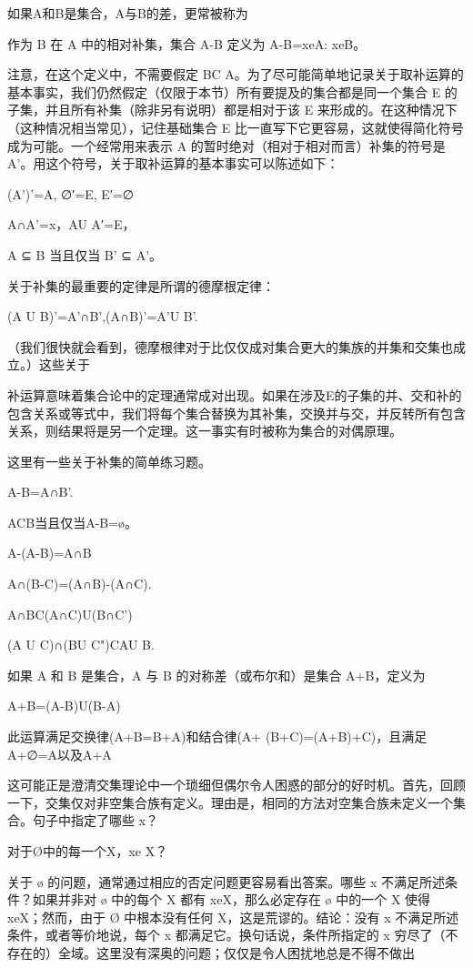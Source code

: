 \documentclass[12pt,a4paper]{ctexbook}
\theoremstyle{definition}
\theoremstyle{remark}
\begin{document}
如果A和B是集合，A与B的差，更常被称为

作为 B 在 A 中的相对补集，集合 A-B 定义为 A-B={xeA: xeB}。

注意，在这个定义中，不需要假定 BC A。为了尽可能简单地记录关于取补运算的基本事实，我们仍然假定（仅限于本节）所有要提及的集合都是同一个集合 E 的子集，并且所有补集（除非另有说明）都是相对于该 E 来形成的。在这种情况下（这种情况相当常见），记住基础集合 E 比一直写下它更容易，这就使得简化符号成为可能。一个经常用来表示 A 的暂时绝对（相对于相对而言）补集的符号是 A'。用这个符号，关于取补运算的基本事实可以陈述如下：

(A')'=A, ∅′=E, E′=∅

A∩A'=x，AU A′=E，

A ⊆ B 当且仅当 B' ⊆ A'。

关于补集的最重要的定律是所谓的德摩根定律：

(A U B)'=A'∩B',(A∩B)'=A'U B'.

（我们很快就会看到，德摩根律对于比仅仅成对集合更大的集族的并集和交集也成立。）这些关于

补运算意味着集合论中的定理通常成对出现。如果在涉及E的子集的并、交和补的包含关系或等式中，我们将每个集合替换为其补集，交换并与交，并反转所有包含关系，则结果将是另一个定理。这一事实有时被称为集合的对偶原理。

这里有一些关于补集的简单练习题。

A-B=A∩B'.

ACB当且仅当A-B=ø。

A-(A-B)=A∩B

A∩(B-C)=(A∩B)-(A∩C).

A∩BC(A∩C)U(B∩C')

(A U C)∩(BU C")CAU B.

如果 A 和 B 是集合，A 与 B 的对称差（或布尔和）是集合 A+B，定义为

A+B=(A-B)U(B-A)

此运算满足交换律(A+B=B+A)和结合律(A+ (B+C)=(A+B)+C)，且满足A+∅=A以及A+A

这可能正是澄清交集理论中一个琐细但偶尔令人困惑的部分的好时机。首先，回顾一下，交集仅对非空集合族有定义。理由是，相同的方法对空集合族未定义一个集合。句子中指定了哪些 x？

对于Ø中的每一个X，xe X？

关于 ø 的问题，通常通过相应的否定问题更容易看出答案。哪些 x 不满足所述条件？如果并非对 ø 中的每个 X 都有 xeX，那么必定存在 ø 中的一个 X 使得 xeX；然而，由于 Ø 中根本没有任何 X，这是荒谬的。结论：没有 x 不满足所述条件，或者等价地说，每个 x 都满足它。换句话说，条件所指定的 x 穷尽了（不存在的）全域。这里没有深奥的问题；仅仅是令人困扰地总是不得不做出
\end{document}
